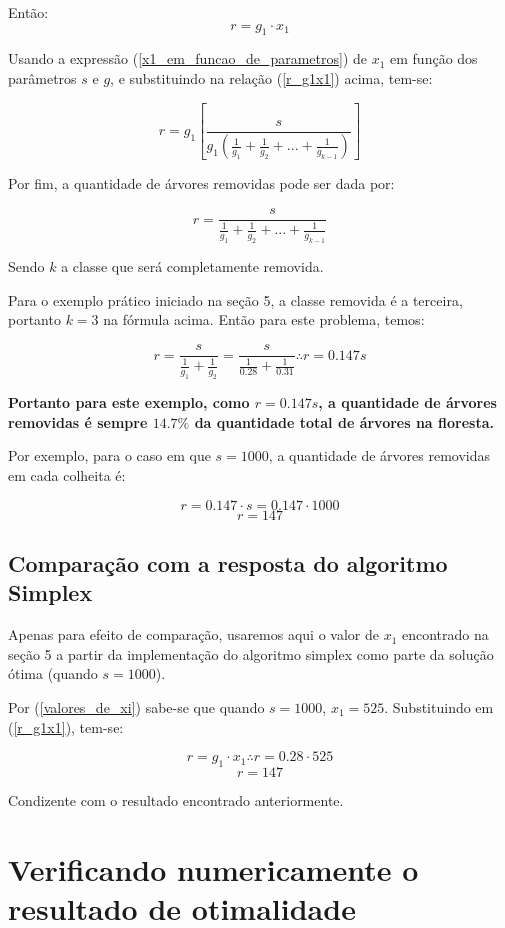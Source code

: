 \documentclass[a4paper, 12pt]{article}
\begin{document}
Então:
\begin{equation}\label{r_g1x1}
r=g_1 \cdot x_1    
\end{equation}

Usando a expressão (\ref{x1_em_funcao_de_parametros}) de $x_1$ em função dos parâmetros $s$ e $g$, e substituindo na relação (\ref{r_g1x1}) acima, tem-se:

$$r=g_1\left[\frac{s}{g_1\left(\frac{1}{g_1}+\frac{1}{g_2}+...+\frac{1}{g_{k-1}}\right)}\right]$$

Por fim, a quantidade de árvores removidas pode ser dada por:

$$r=\frac{s}{\frac{1}{g_1}+\frac{1}{g_2}+...+\frac{1}{g_{k-1}}}$$

Sendo $k$ a classe que será completamente removida.

Para o exemplo prático iniciado na seção 5, a classe removida é a terceira, portanto $k=3$ na fórmula acima. Então para este problema, temos:

$$r=\frac{s}{\frac{1}{g_1}+\frac{1}{g_2}}=\frac{s}{\frac{1}{0.28}+\frac{1}{0.31}}\therefore r=0.147s$$

\textbf{Portanto para este exemplo, como $r=0.147s$, a quantidade de árvores removidas é sempre $14.7\%$ da quantidade total de árvores na floresta.}

Por exemplo, para o caso em que $s=1000$, a quantidade de árvores removidas em cada colheita é:

$$r=0.147 \cdot s=0.147 \cdot 1000$$
$$r=147$$

\subsection{Comparação com a resposta do algoritmo Simplex}

Apenas para efeito de comparação, usaremos aqui o valor de $x_1$ encontrado na seção 5 a partir da implementação do algoritmo simplex como parte da solução ótima (quando $s=1000$).

Por (\ref{valores_de_xi}) sabe-se que quando $s=1000$, $x_1=525$. Substituindo em (\ref{r_g1x1}), tem-se:

$$r=g_1 \cdot x_1  \therefore r=0.28 \cdot 525 $$
$$r = 147$$

Condizente com o resultado encontrado anteriormente.

\section{Verificando numericamente o resultado de otimalidade}
\end{document}
